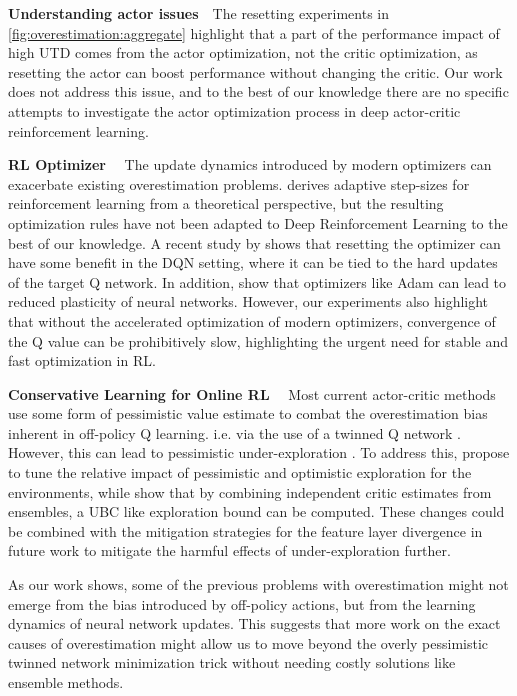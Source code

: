 \textbf{Understanding actor issues}~~The resetting experiments in \autoref{fig:overestimation:aggregate} highlight that a part of the performance impact of high UTD comes from the actor optimization, not the critic optimization, as resetting the actor can boost performance without changing the critic.
Our work does not address this issue, and to the best of our knowledge there are no specific attempts to investigate the actor optimization process in deep actor-critic reinforcement learning.

{\bf RL Optimizer}~~ The update dynamics introduced by modern optimizers can exacerbate existing overestimation problems. 
\textcite{dabney2014adaptive} derives adaptive step-sizes for reinforcement learning from a theoretical perspective, but the resulting optimization rules have not been adapted to Deep Reinforcement Learning to the best of our knowledge.
A recent study by \textcite{asadi2023resetting} shows that resetting the optimizer can have some benefit in the DQN setting, where it can be tied to the hard updates of the target Q network.
In addition, \textcite{lyle2023understanding} show that optimizers like Adam can lead to reduced plasticity of neural networks.
However, our experiments also highlight that without the accelerated optimization of modern optimizers, convergence of the Q value can be prohibitively slow, highlighting the urgent need for stable and fast optimization in RL.

{\bf Conservative Learning for Online RL}~~ Most current actor-critic methods use some form of pessimistic value estimate to combat the overestimation bias inherent in off-policy Q learning. i.e. via the use of a twinned Q network \parencite{fujimoto2018addressing}.
However, this can lead to pessimistic under-exploration \parencite{lan2020maxmin}.
To address this, \textcite{moskovitz2021tactical} propose to tune the relative impact of pessimistic and optimistic exploration for the environments, while \textcite{lee2021sunrise} show that by combining independent critic estimates from ensembles, a UBC like exploration bound can be computed.
These changes could be combined with the mitigation strategies for the feature layer divergence in future work to mitigate the harmful effects of under-exploration further.

As our work shows, some of the previous problems with overestimation might not emerge from the bias introduced by off-policy actions, but from the learning dynamics of neural network updates.
This suggests that more work on the exact causes of overestimation might allow us to move beyond the overly pessimistic twinned network minimization trick without needing costly solutions like ensemble methods.

